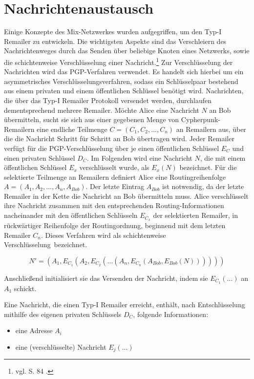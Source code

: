 \section{Nachrichtenaustausch}
Einige Konzepte des Mix-Netzwerkes wurden aufgegriffen, um den Typ-I Remailer zu entwickeln. Die wichtigsten Aspekte sind das Verschleiern des Nachrichtenweges durch das Senden über beliebige Knoten eines Netzwerks, sowie die schichtenweise Verschlüsselung einer Nachricht.\footnote{vgl. S. 84 \cite{sambleben2013informationstechnologie}.} Zur Verschlüsselung der Nachrichten wird das PGP-Verfahren verwendet. Es handelt sich hierbei um ein asymmetrisches Verschlüsselungsverfahren, sodass ein Schlüsselpaar bestehend aus einem privaten und einem öffentlichen Schlüssel benötigt wird.
Nachrichten, die über das Typ-I Remailer Protokoll versendet werden, durchlaufen dementsprechend mehrere Remailer. Möchte Alice eine Nachricht \(N\) an Bob übermitteln, sucht sie sich aus einer gegebenen Menge von Cypherpunk-Remailern eine endliche Teilmenge \(C = (C_1, C_2, ..., C_n)\) an Remailern aus, über die die Nachricht Schritt für Schritt an Bob übertragen wird. Jeder Remailer verfügt für die PGP-Verschlüsselung über je einen öffentlichen Schlüssel \(E_C\) und einen privaten Schlüssel \(D_C\). Im Folgenden wird eine Nachricht \(N\), die mit einem öffentlichen Schlüssel \(E_x\) verschlüsselt wurde, als \(E_x(N)\) bezeichnet. Für die selektierte Teilmenge an Remailern definiert Alice eine Routingreihenfolge \(A = (A_1, A_2, ..., A_n, A_{Bob})\). Der letzte Eintrag \(A_{Bob}\) ist notwendig, da der letzte Remailer in der Kette die Nachricht an Bob übermitteln muss.
Alice verschlüsselt ihre Nachricht zusammen mit den entsprechenden Routing-Informationen nacheinander mit den öffentlichen Schlüsseln \(E_{C_x}\) der selektierten Remailer, in rückwärtiger Reihenfolge der Routingordnung, beginnend mit dem letzten Remailer \(C_n\). Dieses Verfahren wird als \glqq schichtenweise Verschlüsselung\grqq ~bezeichnet.

\begin{equation}
N' = (A_1, E_{C_1}(A_2, E_{C_2} (... (A_n,  E_{C_n}(A_{Bob}, E_{Bob}(N))))))
\end{equation}

Anschließend initialisiert sie das Versenden der Nachricht, indem sie \(E_{C_1}(\dots)\) an \(A_1\) schickt.

Eine Nachricht, die einen Typ-I Remailer erreicht, enthält, nach Entschlüsselung mithilfe des eigenen privaten Schlüssels \(D_C\), folgende Informationen:
\begin{itemize}
\item eine Adresse \(A_i\)
\item eine (verschlüsselte) Nachricht \(E_j(...)\)
\end{itemize}

